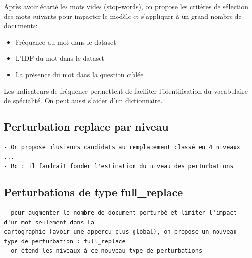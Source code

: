         Après avoir écarté les mots vides (stop-words), on propose les critères de sélection des mots suivants pour impacter le modèle et s'appliquer à un grand nombre de documents:
        \begin{itemize}
            \item Fréquence du mot dans le dataset
            \item L'IDF du mot dans le dataset
            \item La présence du mot dans la question ciblée
        \end{itemize}

        
        Les indicateurs de fréquence permettent de faciliter l'identification du vocabulaire de spécialité. On peut aussi s'aider d'un dictionnaire. 



    \subsection{Perturbation replace par niveau}
        \begin{verbatim}
- On propose plusieurs candidats au remplacement classé en 4 niveaux ...
- Rq : il faudrait fonder l'estimation du niveau des perturbations
        \end{verbatim}

        

    \subsection{Perturbations de type full\_replace}
        \begin{verbatim}
- pour augmenter le nombre de document perturbé et limiter l'impact d'un mot seulement dans la 
cartographie (avoir une apperçu plus global), on propose un nouveau type de perturbation : full_replace
- on étend les niveaux à ce nouveau type de perturbations
        \end{verbatim}


